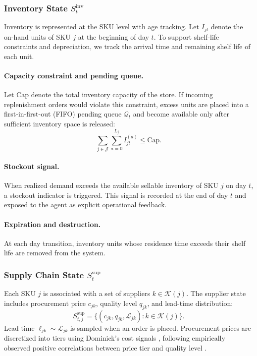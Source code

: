 \subsubsection{Inventory State $S_t^{\text{inv}}$}

Inventory is represented at the SKU level with age tracking. Let $I_{jt}$ denote the on-hand units of SKU $j$ at the beginning of day $t$. To support shelf-life constraints and depreciation, we track the arrival time and remaining shelf life of each unit.

\paragraph{Capacity constraint and pending queue.}
Let $\mathrm{Cap}$ denote the total inventory capacity of the store. If incoming replenishment orders would violate this constraint, excess units are placed into a first-in-first-out (FIFO) pending queue $\mathcal{Q}_t$ and become available only after sufficient inventory space is released:
\begin{equation}
\sum_{j\in\mathcal{J}} \sum_{a=0}^{L_j} I_{jt}^{(a)} \le \mathrm{Cap}.
\end{equation}

\paragraph{Stockout signal.}
When realized demand exceeds the available sellable inventory of SKU $j$ on day $t$, a stockout indicator is triggered. This signal is recorded at the end of day $t$ and exposed to the agent as explicit operational feedback.

\paragraph{Expiration and destruction.}
At each day transition, inventory units whose residence time exceeds their shelf life are removed from the system.

\subsubsection{Supply Chain State $S_t^{\text{sup}}$}

Each SKU $j$ is associated with a set of suppliers $k \in \mathcal{K}(j)$. The supplier state includes procurement price $c_{jk}$, quality level $q_{jk}$, and lead-time distribution:
\begin{equation}
S_{t,j}^{\text{sup}} =
\big\{(c_{jk}, q_{jk}, \mathcal{L}_{jk}) : k \in \mathcal{K}(j)\big\}.
\end{equation}
Lead time $\ell_{jk} \sim \mathcal{L}_{jk}$ is sampled when an order is placed. Procurement prices are discretized into tiers using Dominick’s cost signals \citep{DominicksDataset}, following empirically observed positive correlations between price tier and quality level \citep{supplychain}.

